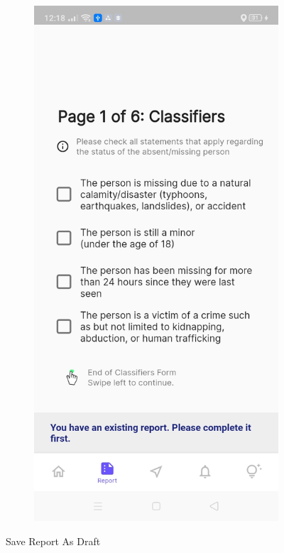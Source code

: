 \begin{figure}[!h]
\begin{subfigure}[c]{0.30\linewidth}
    \end{subfigure}
    \centering
    \begin{subfigure}[c]{0.30\linewidth}
        \centering
        \includegraphics[scale=0.15]{figures/Chapter4/Main/existingReport.jpg}
    \end{subfigure}
    \caption{Save Report As Draft}
    \label{fig:saveDraft}
\end{figure}

